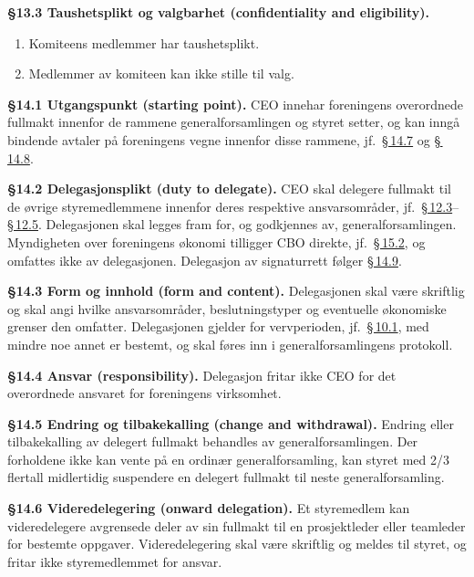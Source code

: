 \documentclass{../../../Common/Latex/Templates/rapport}
\begin{document}
\textbf{\S 13.3 Taushetsplikt og valgbarhet (confidentiality and eligibility).}\label{nbylaw:13.3}
\begin{enumerate}
  \item Komiteens medlemmer har taushetsplikt.
  \item Medlemmer av komiteen kan ikke stille til valg.
\end{enumerate}

\label{nbylaw:14}
\textbf{\S 14.1 Utgangspunkt (starting point).}\label{nbylaw:14.1} CEO innehar foreningens overordnede fullmakt innenfor de rammene generalforsamlingen og styret setter, og kan inng\r{a} bindende avtaler p\r{a} foreningens vegne innenfor disse rammene, jf.\ \hyperref[nbylaw:14.7]{\S\,14.7} og \hyperref[nbylaw:14.8]{\S\,14.8}.

\textbf{\S 14.2 Delegasjonsplikt (duty to delegate).}\label{nbylaw:14.2} CEO skal delegere fullmakt til de øvrige styremedlemmene innenfor deres respektive ansvarsomr\r{a}der, jf.\ \hyperref[nbylaw:12.3]{\S\,12.3}--\hyperref[nbylaw:12.5]{\S\,12.5}. Delegasjonen skal legges fram for, og godkjennes av, generalforsamlingen. Myndigheten over foreningens økonomi tilligger CBO direkte, jf.\ \hyperref[nbylaw:15.2]{\S\,15.2}, og omfattes ikke av delegasjonen. Delegasjon av signaturrett følger \hyperref[nbylaw:14.9]{\S\,14.9}.

\textbf{\S 14.3 Form og innhold (form and content).}\label{nbylaw:14.3} Delegasjonen skal være skriftlig og skal angi hvilke ansvarsomr\r{a}der, beslutningstyper og eventuelle økonomiske grenser den omfatter. Delegasjonen gjelder for vervperioden, jf.\ \hyperref[nbylaw:10.1]{\S\,10.1}, med mindre noe annet er bestemt, og skal føres inn i generalforsamlingens protokoll.

\textbf{\S 14.4 Ansvar (responsibility).}\label{nbylaw:14.4} Delegasjon fritar ikke CEO for det overordnede ansvaret for foreningens virksomhet.

\textbf{\S 14.5 Endring og tilbakekalling (change and withdrawal).}\label{nbylaw:14.5} Endring eller tilbakekalling av delegert fullmakt behandles av generalforsamlingen. Der forholdene ikke kan vente p\r{a} en ordinær generalforsamling, kan styret med 2/3 flertall midlertidig suspendere en delegert fullmakt til neste generalforsamling.

\textbf{\S 14.6 Videredelegering (onward delegation).}\label{nbylaw:14.6} Et styremedlem kan videredelegere avgrensede deler av sin fullmakt til en prosjektleder eller teamleder for bestemte oppgaver. Videredelegering skal være skriftlig og meldes til styret, og fritar ikke styremedlemmet for ansvar.
\end{document}
